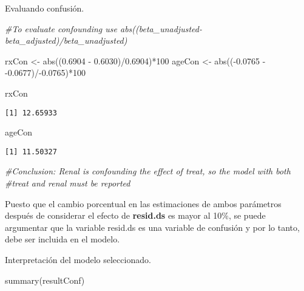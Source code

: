 \documentclass[
]{article}
\newenvironment{Shaded}{\begin{snugshade}}{\end{snugshade}}
\newcommand{\CommentTok}[1]{\textcolor[rgb]{0.56,0.35,0.01}{\textit{#1}}}
\newcommand{\DecValTok}[1]{\textcolor[rgb]{0.00,0.00,0.81}{#1}}
\newcommand{\FloatTok}[1]{\textcolor[rgb]{0.00,0.00,0.81}{#1}}
\newcommand{\FunctionTok}[1]{\textcolor[rgb]{0.00,0.00,0.00}{#1}}
\newcommand{\NormalTok}[1]{#1}
\newcommand{\OtherTok}[1]{\textcolor[rgb]{0.56,0.35,0.01}{#1}}
\newcommand{\SpecialCharTok}[1]{\textcolor[rgb]{0.00,0.00,0.00}{#1}}
\begin{document}
Evaluando confusión.

\begin{Shaded}
\begin{Highlighting}[]
\CommentTok{\#To evaluate confounding use abs((beta\_unadjusted{-}beta\_adjusted)/beta\_unadjusted)}

\NormalTok{rxCon }\OtherTok{\textless{}{-}} \FunctionTok{abs}\NormalTok{((}\FloatTok{0.6904} \SpecialCharTok{{-}} \FloatTok{0.6030}\NormalTok{)}\SpecialCharTok{/}\FloatTok{0.6904}\NormalTok{)}\SpecialCharTok{*}\DecValTok{100}
\NormalTok{ageCon }\OtherTok{\textless{}{-}} \FunctionTok{abs}\NormalTok{((}\SpecialCharTok{{-}}\FloatTok{0.0765} \SpecialCharTok{{-}} \SpecialCharTok{{-}}\FloatTok{0.0677}\NormalTok{)}\SpecialCharTok{/{-}}\FloatTok{0.0765}\NormalTok{)}\SpecialCharTok{*}\DecValTok{100}

\NormalTok{rxCon}
\end{Highlighting}
\end{Shaded}

\begin{verbatim}
[1] 12.65933
\end{verbatim}

\begin{Shaded}
\begin{Highlighting}[]
\NormalTok{ageCon}
\end{Highlighting}
\end{Shaded}

\begin{verbatim}
[1] 11.50327
\end{verbatim}

\begin{Shaded}
\begin{Highlighting}[]
\CommentTok{\#Conclusion: Renal is confounding the effect of treat, so the model with both}
\CommentTok{\#treat and renal must be reported}
\end{Highlighting}
\end{Shaded}

Puesto que el cambio porcentual en las estimaciones de ambos parámetros
después de considerar el efecto de \textbf{resid.ds} es mayor al 10\%,
se puede argumentar que la variable resid.ds es una variable de
confusión y por lo tanto, debe ser incluida en el modelo.

Interpretación del modelo seleccionado.

\begin{Shaded}
\begin{Highlighting}[]
\FunctionTok{summary}\NormalTok{(resultConf)}
\end{Highlighting}
\end{Shaded}
\end{document}
